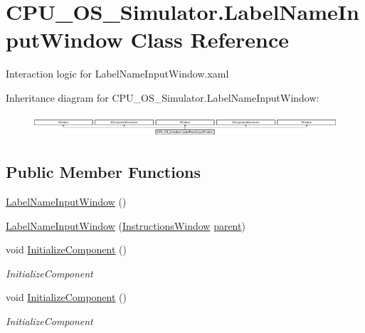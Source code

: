 \hypertarget{class_c_p_u___o_s___simulator_1_1_label_name_input_window}{}\section{C\+P\+U\+\_\+\+O\+S\+\_\+\+Simulator.\+Label\+Name\+Input\+Window Class Reference}
\label{class_c_p_u___o_s___simulator_1_1_label_name_input_window}


Interaction logic for Label\+Name\+Input\+Window.\+xaml  


Inheritance diagram for C\+P\+U\+\_\+\+O\+S\+\_\+\+Simulator.\+Label\+Name\+Input\+Window\+:\begin{figure}[H]
\begin{center}
\leavevmode
\includegraphics[height=0.838951cm]{class_c_p_u___o_s___simulator_1_1_label_name_input_window}
\end{center}
\end{figure}
\subsection*{Public Member Functions}
\begin{DoxyCompactItemize}
\item 
\hyperlink{class_c_p_u___o_s___simulator_1_1_label_name_input_window_a5dd9025e46bb4f4543a1f16880b007d9}{Label\+Name\+Input\+Window} ()
\item 
\hyperlink{class_c_p_u___o_s___simulator_1_1_label_name_input_window_a1b661c1dd9aee3024273826489e310ac}{Label\+Name\+Input\+Window} (\hyperlink{class_c_p_u___o_s___simulator_1_1_instructions_window}{Instructions\+Window} \hyperlink{class_c_p_u___o_s___simulator_1_1_label_name_input_window_abaa496579fc3e72440fac2324bbebfd9}{parent})
\item 
void \hyperlink{class_c_p_u___o_s___simulator_1_1_label_name_input_window_a6ba9d0a62a1eca95c133b6384a83073e}{Initialize\+Component} ()
\begin{DoxyCompactList}\small\item\em Initialize\+Component \end{DoxyCompactList}\item 
void \hyperlink{class_c_p_u___o_s___simulator_1_1_label_name_input_window_a6ba9d0a62a1eca95c133b6384a83073e}{Initialize\+Component} ()
\begin{DoxyCompactList}\small\item\em Initialize\+Component \end{DoxyCompactList}\end{DoxyCompactItemize}
